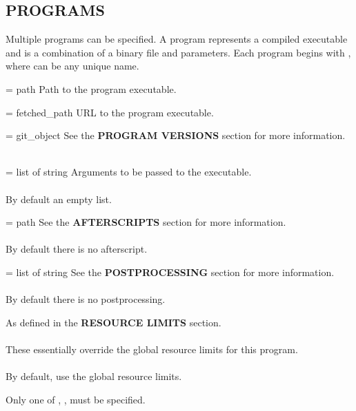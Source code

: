 \documentclass[a4paper,english]{article}
\begin{document}
\begin{adjustwidth}{18pt}{0pt}
    \section{PROGRAMS}

        Multiple programs can be specified.
        A program represents a compiled executable and is a combination of a binary file and parameters.
        Each program begins with , where  can be any unique name.

        \begin{Description}[Options]\setlength{\itemsep}{0cm}
            \item[\Opt{binary} = path]
              Path to the program executable.
            \item[\Opt{fetch} = fetched\_path]
              URL to the program executable.
            \item[\Opt{git} = git\_object]
              See the \textbf{PROGRAM VERSIONS} section for more information. \\ \\
            \item[\Opt{arguments?} = list of string]
              Arguments to be passed to the executable. \\ \\
              By default an empty list.
            \item[\Opt{afterscript?} = path]
              See the \textbf{AFTERSCRIPTS} section for more information. \\ \\
              By default there is no afterscript.
            \item[\Opt{next?} = list of string]
              See the \textbf{POSTPROCESSING} section for more information. \\ \\
              By default there is no postprocessing.
            \item[\Opt{resource\_limits?}]
              As defined in the \textbf{RESOURCE LIMITS} section. \\ \\
              These essentially override the global resource limits for
              this program. \\ \\
              By default, use the global resource limits.
        \end{Description}

        Only one of , ,  must be specified.


\end{adjustwidth}
\end{document}
